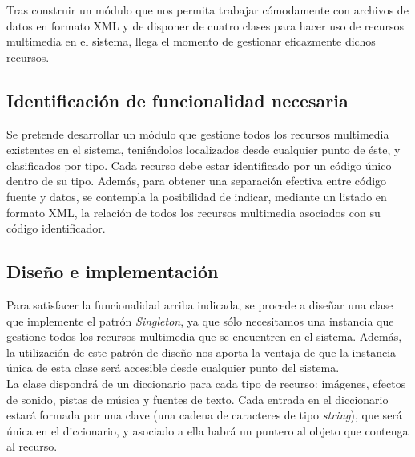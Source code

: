 



Tras construir un módulo que nos permita trabajar cómodamente con archivos de datos en formato XML y de disponer de cuatro clases para hacer uso de recursos multimedia en el sistema, llega el momento de gestionar eficazmente dichos recursos.

\subsection{Identificación de funcionalidad necesaria}

Se pretende desarrollar un módulo que gestione todos los recursos multimedia existentes en el sistema, teniéndolos localizados desde cualquier punto de éste, y clasificados por tipo. Cada recurso debe estar identificado por un código único dentro de su tipo. Además, para obtener una separación efectiva entre código fuente y datos, se contempla la posibilidad de indicar, mediante un listado en formato XML, la relación de todos los recursos multimedia asociados con su código identificador.

\subsection{Diseño e implementación}

Para satisfacer la funcionalidad arriba indicada, se procede a diseñar una clase que implemente el patrón \emph{Singleton}, ya que sólo necesitamos una instancia que gestione todos los recursos multimedia que se encuentren en el sistema. Además, la utilización de este patrón de diseño nos aporta la ventaja de que la instancia única de esta clase será accesible desde cualquier punto del sistema.\\

La clase dispondrá de un diccionario para cada tipo de recurso: imágenes, efectos de sonido, pistas de música y fuentes de texto. Cada entrada en el diccionario estará formada por una clave (una cadena de caracteres de tipo \emph{string}), que será única en el diccionario, y asociado a ella habrá un puntero al objeto que contenga al recurso.\\


